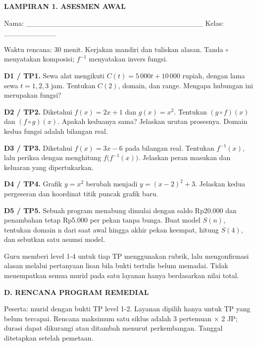 \documentclass[11pt,a4paper]{article}
\begin{document}
\clearpage
\begin{center}\bfseries\large LAMPIRAN 1. ASESMEN AWAL\end{center}\medskip
{\small Nama: \_\_\_\_\_\_\_\_\_\_\_\_\_\_\_\_\_\_\_\_\_\_\_\_\_\_\_\_\_\_\_\_\_\_  Kelas: \_\_\_\_\_\_\_\_\_\_\par}\medskip
{\small Waktu rencana: 30 menit. Kerjakan mandiri dan tuliskan alasan. Tanda \(\circ\) menyatakan komposisi; \(f^{-1}\) menyatakan invers fungsi.\par}\medskip
\noindent\textbf{D1 / TP1.} Sewa alat mengikuti \(C(t) = 5\,000t + 10\,000\) rupiah, dengan lama sewa \(t = 1, 2, 3\) jam. Tentukan \(C(2)\), domain, dan range. Mengapa hubungan ini merupakan fungsi?\par\vspace{10mm}
\noindent\textbf{D2 / TP2.} Diketahui \(f(x) = 2x + 1\) dan \(g(x) = x^2\). Tentukan \((g\circ f)(x)\) dan \((f\circ g)(x)\). Apakah keduanya sama? Jelaskan urutan prosesnya. Domain kedua fungsi adalah bilangan real.\par\vspace{10mm}
\noindent\textbf{D3 / TP3.} Diketahui \(f(x) = 3x - 6\) pada bilangan real. Tentukan \(f^{-1}(x)\), lalu periksa dengan menghitung \(f\bigl(f^{-1}(x)\bigr)\). Jelaskan peran masukan dan keluaran yang dipertukarkan.\par\vspace{10mm}
\noindent\textbf{D4 / TP4.} Grafik \(y = x^2\) berubah menjadi \(y = (x - 2)^2 + 3\). Jelaskan kedua pergeseran dan koordinat titik puncak grafik baru.\par\vspace{10mm}
\noindent\textbf{D5 / TP5.} Sebuah program menabung dimulai dengan saldo Rp20.000 dan penambahan tetap Rp5.000 per pekan tanpa bunga. Buat model \(S(n)\), tentukan domain n dari saat awal hingga akhir pekan keempat, hitung \(S(4)\), dan sebutkan satu asumsi model.\par\vspace{10mm}
{\small Guru memberi level 1-4 untuk tiap TP menggunakan rubrik, lalu mengonfirmasi alasan melalui pertanyaan lisan bila bukti tertulis belum memadai. Tidak menempatkan semua murid pada satu layanan hanya berdasarkan nilai total.\par}\medskip
\clearpage
\begin{center}\bfseries\large D. RENCANA PROGRAM REMEDIAL\end{center}\medskip
Peserta: murid dengan bukti TP level 1-2. Layanan dipilih hanya untuk TP yang belum tercapai. Rencana maksimum satu siklus adalah 3 pertemuan × 2 JP; durasi dapat dikurangi atau ditambah menurut perkembangan. Tanggal ditetapkan setelah pemetaan.\par\medskip
\end{document}
